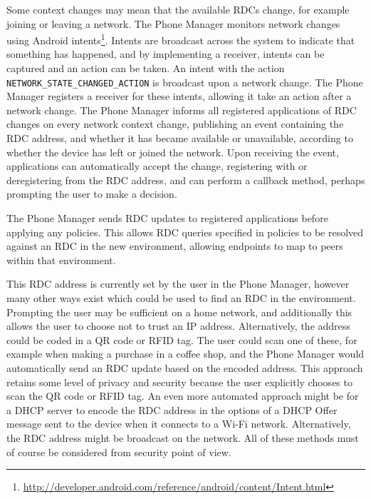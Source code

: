 \documentclass[12pt,twoside,notitlepage]{report}
\begin{document}
Some context changes may mean that the available RDCs change, for example joining or leaving a network. 
The Phone Manager monitors network changes using Android intents\footnote{\url{http://developer.android.com/reference/android/content/Intent.html}}. 
Intents are broadcast across the system to indicate that something has happened, and by implementing a receiver, intents can be captured and an action can be taken. 
An intent with the action {\tt NETWORK\_STATE\_CHANGED\_ACTION} is broadcast upon a network change. 
The Phone Manager registers a receiver for these intents, allowing it take an action after a network change. 
The Phone Manager informs all registered applications of RDC changes on every network context change, publishing an event containing the RDC address, and whether it has became available or unavailable, according to whether the device has left or joined the network. 
Upon receiving the event, applications can automatically accept the change, registering with or deregistering from the RDC address, and can perform a callback method, perhaps prompting the user to make a decision. 


The Phone Manager sends RDC updates to registered applications before applying any policies. 
This allows RDC queries specified in policies to be resolved against an RDC in the new environment, allowing endpoints to map to peers within that environment. 

This RDC address is currently set by the user in the Phone Manager, however many other ways exist which could be used to find an RDC in the environment. 
Prompting the user may be sufficient on a home network, and additionally this allows the user to choose not to trust an IP address. 
Alternatively, the address could be coded in a QR code or RFID tag. 
The user could scan one of these, for example when making a purchase in a coffee shop, and the Phone Manager would automatically send an RDC update based on the encoded address. 
This approach retains some level of privacy and security because the user explicitly chooses to scan the QR code or RFID tag. 
An even more automated approach might be for a DHCP server to encode the RDC address in the options of a DHCP Offer message \cite{droms1997dynamic} sent to the device when it connects to a Wi-Fi network. 
Alternatively, the RDC address might be broadcast on the network. 
All of these methods must of course be considered from security point of view. 
\end{document}
